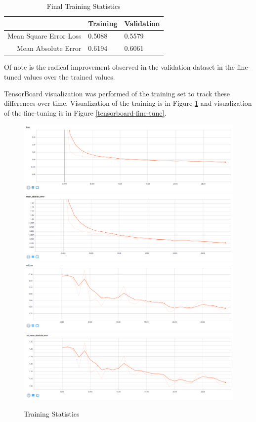 \documentclass{article}
\begin{document}
\begin{table}[ht]
    \centering
    \begin{tabular}{|r|l|l|}
        \hline
        & Training & Validation \\ \hline
        Mean Square Error Loss & 0.5088 & 0.5579 \\ \hline
        Mean Absolute Error & 0.6194 & 0.6061 \\ \hline
    \end{tabular}
    \caption{Final Training Statistics}
    \label{fine-tuning}
\end{table}

Of note is the radical improvement observed in the validation dataset in the fine-tuned values over the trained values.

TensorBoard visualization was performed of the training set to track these differences over time.  Visualization of the training is in Figure \ref{tensorboard-train} and visualization of the fine-tuning is in Figure \ref{tensorboard-fine-tune}.

\begin{figure}[H]
    \centering
    \includegraphics[width=.9\linewidth]{train-train-loss.png}
    \includegraphics[width=.9\linewidth]{train-train-mean-abs-error.png}
    \includegraphics[width=.9\linewidth]{train-validation-loss.png}
    \includegraphics[width=.9\linewidth]{train-validation-mean-abs-error.png}
    \caption{Training Statistics}
    \label{tensorboard-train}
\end{figure}
\end{document}

